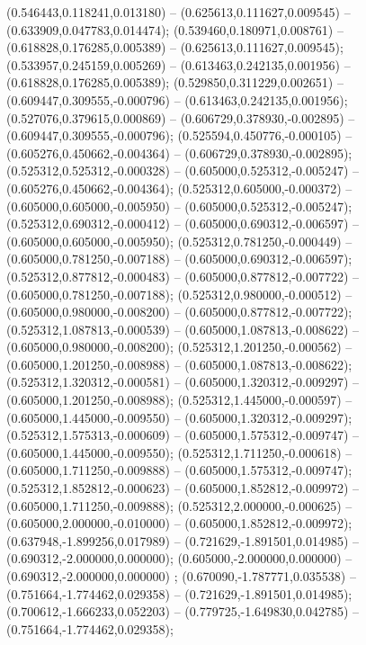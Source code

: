  (0.546443,0.118241,0.013180) -- (0.625613,0.111627,0.009545) -- (0.633909,0.047783,0.014474);
 (0.539460,0.180971,0.008761) -- (0.618828,0.176285,0.005389) -- (0.625613,0.111627,0.009545);
 (0.533957,0.245159,0.005269) -- (0.613463,0.242135,0.001956) -- (0.618828,0.176285,0.005389);
 (0.529850,0.311229,0.002651) -- (0.609447,0.309555,-0.000796) -- (0.613463,0.242135,0.001956);
 (0.527076,0.379615,0.000869) -- (0.606729,0.378930,-0.002895) -- (0.609447,0.309555,-0.000796);
 (0.525594,0.450776,-0.000105) -- (0.605276,0.450662,-0.004364) -- (0.606729,0.378930,-0.002895);
 (0.525312,0.525312,-0.000328) -- (0.605000,0.525312,-0.005247) -- (0.605276,0.450662,-0.004364);
 (0.525312,0.605000,-0.000372) -- (0.605000,0.605000,-0.005950) -- (0.605000,0.525312,-0.005247);
 (0.525312,0.690312,-0.000412) -- (0.605000,0.690312,-0.006597) -- (0.605000,0.605000,-0.005950);
 (0.525312,0.781250,-0.000449) -- (0.605000,0.781250,-0.007188) -- (0.605000,0.690312,-0.006597);
 (0.525312,0.877812,-0.000483) -- (0.605000,0.877812,-0.007722) -- (0.605000,0.781250,-0.007188);
 (0.525312,0.980000,-0.000512) -- (0.605000,0.980000,-0.008200) -- (0.605000,0.877812,-0.007722);
 (0.525312,1.087813,-0.000539) -- (0.605000,1.087813,-0.008622) -- (0.605000,0.980000,-0.008200);
 (0.525312,1.201250,-0.000562) -- (0.605000,1.201250,-0.008988) -- (0.605000,1.087813,-0.008622);
 (0.525312,1.320312,-0.000581) -- (0.605000,1.320312,-0.009297) -- (0.605000,1.201250,-0.008988);
 (0.525312,1.445000,-0.000597) -- (0.605000,1.445000,-0.009550) -- (0.605000,1.320312,-0.009297);
 (0.525312,1.575313,-0.000609) -- (0.605000,1.575312,-0.009747) -- (0.605000,1.445000,-0.009550);
 (0.525312,1.711250,-0.000618) -- (0.605000,1.711250,-0.009888) -- (0.605000,1.575312,-0.009747);
 (0.525312,1.852812,-0.000623) -- (0.605000,1.852812,-0.009972) -- (0.605000,1.711250,-0.009888);
 (0.525312,2.000000,-0.000625) -- (0.605000,2.000000,-0.010000) -- (0.605000,1.852812,-0.009972);
 (0.637948,-1.899256,0.017989) -- (0.721629,-1.891501,0.014985) -- (0.690312,-2.000000,0.000000);
 (0.605000,-2.000000,0.000000) -- (0.690312,-2.000000,0.000000) ;
 (0.670090,-1.787771,0.035538) -- (0.751664,-1.774462,0.029358) -- (0.721629,-1.891501,0.014985);
 (0.700612,-1.666233,0.052203) -- (0.779725,-1.649830,0.042785) -- (0.751664,-1.774462,0.029358);
